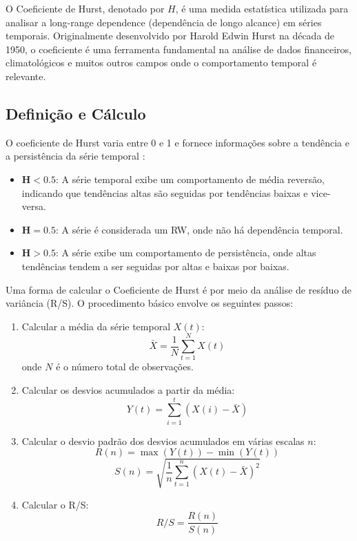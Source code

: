 O Coeficiente de Hurst, denotado por \( H \), é uma medida estatística utilizada para analisar a long-range dependence (dependência de longo alcance) em séries temporais. Originalmente desenvolvido por Harold Edwin Hurst na década de 1950, o coeficiente é uma ferramenta fundamental na análise de dados financeiros, climatológicos e muitos outros campos onde o comportamento temporal é relevante.

\subsection{Definição e Cálculo}

O coeficiente de Hurst varia entre 0 e 1 e fornece informações sobre a tendência e a persistência da série temporal \cite{hurst1951}:

\begin{itemize}
	\item \( \mathbf{H} < \mathbf{0.5} \): A série temporal exibe um comportamento de média reversão, indicando que tendências altas são seguidas por tendências baixas e vice-versa.
	\item \( \mathbf{H} = \mathbf{0.5} \): A série é considerada um \acl{RW}, onde não há dependência temporal.
	\item \( \mathbf{H} > \mathbf{0.5} \): A série exibe um comportamento de persistência, onde altas tendências tendem a ser seguidas por altas e baixas por baixas.
\end{itemize}

Uma forma de calcular o Coeficiente de Hurst é por meio da análise de resíduo de variância (R/S). O procedimento básico envolve os seguintes passos:


\begin{enumerate}
	\item Calcular a média da série temporal \( X(t) \):
	      \[
		      \bar{X} = \frac{1}{N} \sum_{t=1}^{N} X(t)
	      \]
	      onde \( N \) é o número total de observações.
	\item Calcular os desvios acumulados a partir da média:
	      \[
		      Y(t) = \sum_{i=1}^{t} (X(i) - \bar{X})
	      \]
	\item Calcular o desvio padrão dos desvios acumulados em várias escalas \( n \):
	      \[
		      R(n) = \max(Y(t)) - \min(Y(t))
	      \]
	      \[
		      S(n) = \sqrt{\frac{1}{n} \sum_{t=1}^{n} (X(t) - \bar{X})^2}
	      \]
	\item Calcular o R/S:
	      \begin{equation}
		      R/S = \frac{R(n)}{S(n)}
		      \label{eq:hurst}
	      \end{equation}
\end{enumerate}